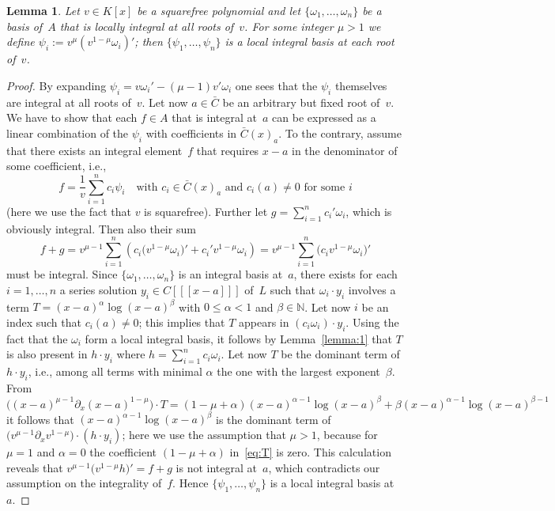 \documentclass[final,1p,times,authoryear]{elsarticle}
\newtheorem{lemma}[theorem]{Lemma}
\newcommand{\bN}{ {\mathbb N}}
\begin{document}
\begin{lemma}\label{lemma:ibv}
Let $v\in K[x]$ be a squarefree polynomial and let $\{\omega_1,\ldots,\omega_n\}$
be a basis of~$A$ that is locally integral at all roots of~$v$.
For some integer $\mu>1$ we define $\psi_i:=v^\mu\left(v^{1-\mu}\omega_i\right)'$; then
$\{\psi_1,\ldots,\psi_n\}$ is a local integral basis at each root of~$v$.
\end{lemma}
\begin{proof}
By expanding $\psi_i=v\omega_i'-(\mu-1)v'\omega_i$ one sees that the $\psi_i$
themselves are integral at all roots of~$v$. Let now $a\in\bar{C}$ be an
arbitrary but fixed root of~$v$. We have to show that each $f\in A$ that is
integral at~$a$ can be expressed as a linear combination of the $\psi_i$ with
coefficients in $\bar C(x)_a$. To the contrary, assume that there exists an
integral element~$f$ that requires $x-a$ in the denominator of some
coefficient, i.e.,
\[
  f = \frac{1}{v} \sum_{i=1}^n c_i \psi_i \quad\text{with }c_i\in \bar{C}(x)_a
  \text{ and } c_i(a)\neq0 \text{ for some } i
\]
(here we use the fact that $v$ is squarefree).  Further let $g=\sum_{i=1}^n
c_i'\omega_i$, which is obviously integral. Then also their sum
\[
  f+g = v^{\mu-1} \sum_{i=1}^n \left(c_i\bigl(v^{1-\mu}\omega_i\bigr)'
  + c_i'v^{1-\mu}\omega_i \right) 
  = v^{\mu-1} \sum_{i=1}^n \bigl(c_iv^{1-\mu}\omega_i\bigr)'
\]
must be integral. Since $\{\omega_1,\ldots,\omega_n\}$ is an integral basis at~$a$,
there exists for each $i=1,\ldots,n$ a series solution $y_i\in C[[[x-a]]]$
of~$L$ such that $\omega_i\cdot y_i$ involves a term
$T=(x-a)^\alpha\log(x-a)^\beta$ with $0\leq\alpha<1$ and $\beta\in\bN$.
Let now $i$ be an index such that $c_i(a)\neq0$;
this implies that $T$ appears in $(c_i\omega_i)\cdot y_i$.
Using the fact that the $\omega_i$ form a local integral basis, it follows by
Lemma~\ref{lemma:1} that $T$ is also present in $h\cdot y_i$ where
$h=\sum_{i=1}^n c_i\omega_i$. Let now $T$ be the dominant term of $h\cdot y_i$,
i.e., among all terms with minimal $\alpha$ the one with the largest exponent~$\beta$.
From
\begin{equation}\label{eq:T}
  \bigl((x-a)^{\mu-1} \partial_x (x-a)^{1-\mu}\bigr) \cdot T =
  (1-\mu+\alpha)(x-a)^{\alpha-1}\log(x-a)^\beta + \beta(x-a)^{\alpha-1}\log(x-a)^{\beta-1}
\end{equation}
it follows that $(x-a)^{\alpha-1}\log(x-a)^\beta$ is the dominant term of
$\bigl(v^{\mu-1}\partial_xv^{1-\mu}\bigr)\cdot (h\cdot y_i)$; here we use the
assumption that $\mu>1$, because for $\mu=1$ and $\alpha=0$ the
coefficient $(1-\mu+\alpha)$ in~\eqref{eq:T} is zero. This calculation reveals that
$v^{\mu-1}\bigl(v^{1-\mu}h\bigr)'=f+g$ is not integral at~$a$, which contradicts our assumption on
the integrality of~$f$. Hence $\{\psi_1,\ldots,\psi_n\}$ is a local integral
basis at~$a$.
\end{proof}
\end{document}
